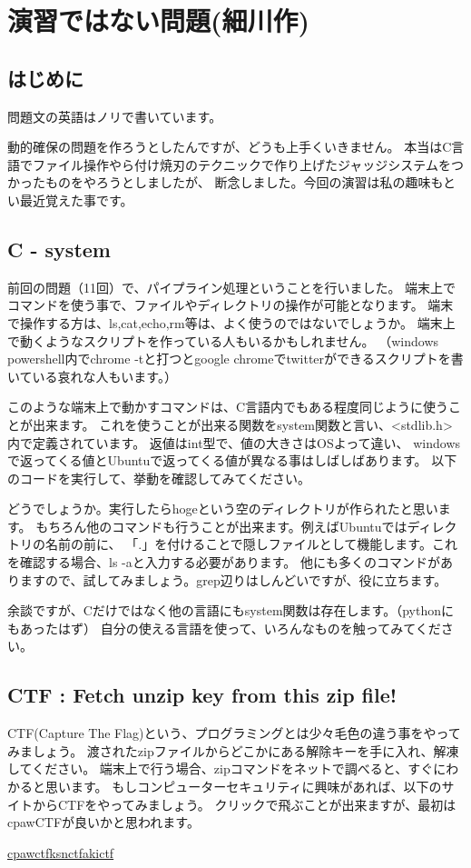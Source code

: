 \section{演習ではない問題(細川作)}
	\subsection{はじめに}
		問題文の英語はノリで書いています。
		
		動的確保の問題を作ろうとしたんですが、どうも上手くいきません。
		本当はC言語でファイル操作やら付け焼刃のテクニックで作り上げたジャッジシステムをつかったものをやろうとしましたが、
		断念しました。今回の演習は私の趣味もとい最近覚えた事です。
		
	\subsection{C - system}
		前回の問題（11回）で、パイプライン処理ということを行いました。
		端末上でコマンドを使う事で、ファイルやディレクトリの操作が可能となります。
		端末で操作する方は、ls,cat,echo,rm等は、よく使うのではないでしょうか。
		端末上で動くようなスクリプトを作っている人もいるかもしれません。
		（windows powershell内でchrome -tと打つとgoogle chromeでtwitterができるスクリプトを書いている哀れな人もいます。）
		
		このような端末上で動かすコマンドは、C言語内でもある程度同じように使うことが出来ます。
		これを使うことが出来る関数をsystem関数と言い、<stdlib.h>内で定義されています。
		返値はint型で、値の大きさはOSよって違い、
		windowsで返ってくる値とUbuntuで返ってくる値が異なる事はしばしばあります。
		以下のコードを実行して、挙動を確認してみてください。
		
		
		
		どうでしょうか。実行したらhogeという空のディレクトリが作られたと思います。
		もちろん他のコマンドも行うことが出来ます。例えばUbuntuではディレクトリの名前の前に、
		「.」を付けることで隠しファイルとして機能します。これを確認する場合、ls -aと入力する必要があります。
		他にも多くのコマンドがありますので、試してみましょう。grep辺りはしんどいですが、役に立ちます。
		
		余談ですが、Cだけではなく他の言語にもsystem関数は存在します。（pythonにもあったはず）
		自分の使える言語を使って、いろんなものを触ってみてください。
		
	\subsection{CTF : Fetch unzip key from this zip file!}
		CTF(Capture The Flag)という、プログラミングとは少々毛色の違う事をやってみましょう。
		渡されたzipファイルからどこかにある解除キーを手に入れ、解凍してください。
		端末上で行う場合、zipコマンドをネットで調べると、すぐにわかると思います。
		もしコンピューターセキュリティに興味があれば、以下のサイトからCTFをやってみましょう。
		クリックで飛ぶことが出来ますが、最初はcpawCTFが良いかと思われます。
		
		\noindent
		[1]\href{https://ctf.cpaw.site/}{cpawctf}\newline
		[2]\href{http://ksnctf.sweetduet.info/}{ksnctf}\newline
		[3]\href{https://ctf.katsudon.org/}{akictf}\newline